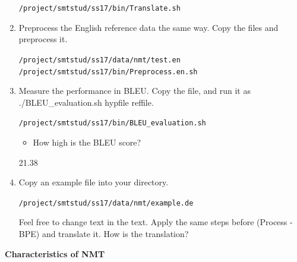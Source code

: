 \documentclass[12pt,fleqn]{article}
\begin{document}
\begin{enumerate}
\texttt{/project/smtstud/ss17/bin/Translate.sh} 

\item Preprocess the English reference data the same way. Copy the files and preprocess it. 

\texttt{/project/smtstud/ss17/data/nmt/test.en}  \\ 
\texttt{/project/smtstud/ss17/bin/Preprocess.en.sh} \\ 

\item Measure the performance in BLEU. Copy the file, and run it as ./BLEU\_evaluation.sh hypfile reffile. 

\texttt{/project/smtstud/ss17/bin/BLEU\_evaluation.sh} \\ 

\begin{itemize} 
 \item How high is the BLEU score? 
\end{itemize}

21.38 

\item Copy an example file into your directory. 

\texttt{/project/smtstud/ss17/data/nmt/example.de} 

Feel free to change text in the text. Apply the same steps before (Process - BPE) and translate it. How is the translation? 

\end{enumerate} 

\textbf{Characteristics of NMT} \\ 
\end{document}
